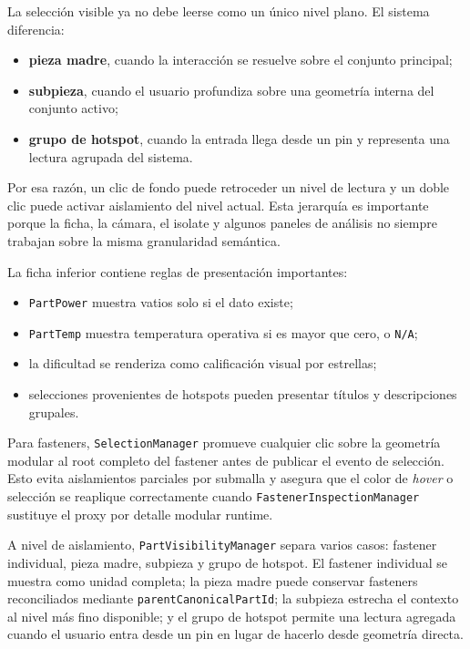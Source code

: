 \documentclass[12pt,letterpaper]{article}
\begin{document}
\noindent La selección visible ya no debe leerse como un único nivel plano. El sistema diferencia:
\begin{itemize}
    \item \textbf{pieza madre}, cuando la interacción se resuelve sobre el conjunto principal;
    \item \textbf{subpieza}, cuando el usuario profundiza sobre una geometría interna del conjunto activo;
    \item \textbf{grupo de hotspot}, cuando la entrada llega desde un pin y representa una lectura agrupada del sistema.
\end{itemize}

\noindent Por esa razón, un clic de fondo puede retroceder un nivel de lectura y un doble clic puede activar aislamiento del nivel actual. Esta jerarquía es importante porque la ficha, la cámara, el isolate y algunos paneles de análisis no siempre trabajan sobre la misma granularidad semántica.

\noindent La ficha inferior contiene reglas de presentación importantes:
\begin{itemize}
    \item \texttt{PartPower} muestra vatios solo si el dato existe;
    \item \texttt{PartTemp} muestra temperatura operativa si es mayor que cero, o \texttt{N/A};
    \item la dificultad se renderiza como calificación visual por estrellas;
    \item selecciones provenientes de hotspots pueden presentar títulos y descripciones grupales.
\end{itemize}

\noindent Para fasteners, \texttt{SelectionManager} promueve cualquier clic sobre la geometría modular al root completo del fastener antes de publicar el evento de selección. Esto evita aislamientos parciales por submalla y asegura que el color de \textit{hover} o selección se reaplique correctamente cuando \texttt{FastenerInspectionManager} sustituye el proxy por detalle modular runtime.

\noindent A nivel de aislamiento, \texttt{PartVisibilityManager} separa varios casos: fastener individual, pieza madre, subpieza y grupo de hotspot. El fastener individual se muestra como unidad completa; la pieza madre puede conservar fasteners reconciliados mediante \texttt{parentCanonicalPartId}; la subpieza estrecha el contexto al nivel más fino disponible; y el grupo de hotspot permite una lectura agregada cuando el usuario entra desde un pin en lugar de hacerlo desde geometría directa.
\end{document}
